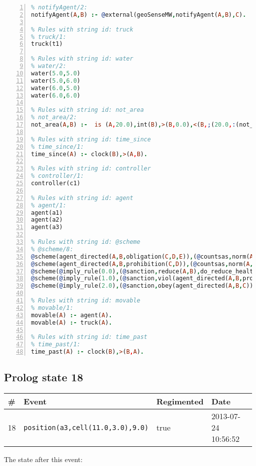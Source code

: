 \documentclass[11pt]{article}\usepackage[utf8]{inputenc}\usepackage{geometry}
\begin{document}
\begin{lstlisting}[language=Prolog, numbers=left]
% Rules with string id: notifyAgent
% notifyAgent/2:
notifyAgent(A,B) :- @external(geoSenseMW,notifyAgent(A,B),C).

% Rules with string id: truck
% truck/1:
truck(t1)

% Rules with string id: water
% water/2:
water(5.0,5.0)
water(5.0,6.0)
water(6.0,5.0)
water(6.0,6.0)

% Rules with string id: not_area
% not_area/2:
not_area(A,B) :-  is (A,20.0),int(B),>(B,0.0),<(B,;(20.0,:(not_area(A,B), is (-(B),20.0)))),int(A),>(A,0.0),<(A,;(20.0,:(area(A,B),-(int(A))))),int(B),>(A,0.0),>(B,0.0),<(A,21.0),<(B,21.0).

% Rules with string id: time_since
% time_since/1:
time_since(A) :- clock(B),>(A,B).

% Rules with string id: controller
% controller/1:
controller(c1)

% Rules with string id: agent
% agent/1:
agent(a1)
agent(a2)
agent(a3)

% Rules with string id: @scheme
% @scheme/8:
@scheme(agent_directed(A,B,obligation(C,D,E)),(@countsas,norm(A,B,F,obligation(C,D,E)),F),false,(listTrue(C)),(time_past(D)),false,[plus(viol(agent_directed(A,B,obligation(C,D,E))))|[]],[plus(obey(agent_directed(A,B,obligation(C,D,E))))|[]])
@scheme(agent_directed(A,B,prohibition(C,D)),(@countsas,norm(A,B,E,prohibition(C,D)),E),(listTrue(C)),false,(false),false,[plus(viol(agent_directed(A,B,prohibition(C,D))))|[]],[plus(obey(agent_directed(A,B,prohibition(C,D))))|[]])
@scheme(@imply_rule(0.0),(@sanction,reduce(A,B),do_reduce_health(A,B),notifyAgent(A,changed(status))),true,false,false,false,[min(reduce(A,B))|[]],[])
@scheme(@imply_rule(1.0),(@sanction,viol(agent_directed(A,B,prohibition(C,D))),do_sanction(D)),true,false,false,false,[min(viol(agent_directed(A,B,prohibition(C,D))))|[]],[])
@scheme(@imply_rule(2.0),(@sanction,obey(agent_directed(A,B,C))),true,false,false,false,[min(obey(agent_directed(A,B,C)))|[]],[])

% Rules with string id: movable
% movable/1:
movable(A) :- agent(A).
movable(A) :- truck(A).

% Rules with string id: time_past
% time_past/1:
time_past(A) :- clock(B),>(B,A).

\end{lstlisting}
\clearpage 
\subsection{Prolog state 18}
\begin{table}[ht]
\centering 
\begin{tabular}{l l l l} 
\textbf{\#} & \textbf{Event} & \textbf{Regimented} & \textbf{Date} \\ [0.5ex] 
\hline
18&\texttt{position(a3,cell(11.0,3.0),9.0)}&true&2013-07-24 10:56:52\\ [1ex] \hline\end{tabular}
\end{table}
The state after this event:
\end{document}
